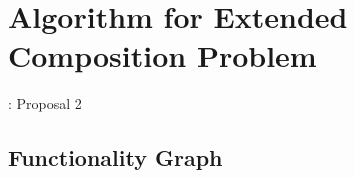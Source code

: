 \documentclass[senior,final,11pt]{iscs-thesis}
\begin{document}







\section{Algorithm for Extended Composition Problem}: Proposal 2%
\subsection{Functionality Graph}%
%
\end{document}

